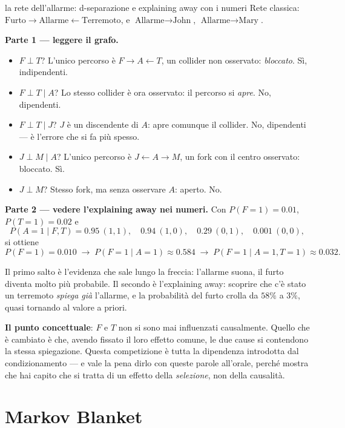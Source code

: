 \begin{esempiosvolto}{la rete dell'allarme: d-separazione e explaining away con i numeri}
Rete classica: $\text{Furto} \to \text{Allarme} \leftarrow \text{Terremoto}$, e $\text{Allarme} \to \text{John}$, $\text{Allarme} \to \text{Mary}$.

\medskip
\textbf{Parte 1 — leggere il grafo.}
\begin{itemize}[leftmargin=1.4em]
  \item $F \perp T$? L'unico percorso è $F \to A \leftarrow T$, un collider non osservato: \emph{bloccato}. Sì, indipendenti.
  \item $F \perp T \mid A$? Lo stesso collider è ora osservato: il percorso si \emph{apre}. No, dipendenti.
  \item $F \perp T \mid J$? $J$ è un discendente di $A$: apre comunque il collider. No, dipendenti — è l'errore che si fa più spesso.
  \item $J \perp M \mid A$? L'unico percorso è $J \leftarrow A \to M$, un fork con il centro osservato: bloccato. Sì.
  \item $J \perp M$? Stesso fork, ma senza osservare $A$: aperto. No.
\end{itemize}

\medskip
\textbf{Parte 2 — vedere l'explaining away nei numeri.} Con
$P(F{=}1) = 0.01$, $P(T{=}1) = 0.02$ e
\[
P(A{=}1 \mid F,T) = 0.95\ (1,1), \quad 0.94\ (1,0), \quad 0.29\ (0,1), \quad 0.001\ (0,0),
\]
si ottiene
\[
P(F{=}1) = 0.010 \;\longrightarrow\; P(F{=}1 \mid A{=}1) \approx 0.584 \;\longrightarrow\; P(F{=}1 \mid A{=}1, T{=}1) \approx 0.032.
\]

Il primo salto è l'evidenza che sale lungo la freccia: l'allarme suona, il furto diventa molto più probabile. Il secondo è l'explaining away: scoprire che c'è stato un terremoto \emph{spiega già} l'allarme, e la probabilità del furto crolla da $58\%$ a $3\%$, quasi tornando al valore a priori.

\textbf{Il punto concettuale}: $F$ e $T$ non si sono mai influenzati causalmente. Quello che è cambiato è che, avendo fissato il loro effetto comune, le due cause si contendono la stessa spiegazione. Questa competizione è tutta la dipendenza introdotta dal condizionamento — e vale la pena dirlo con queste parole all'orale, perché mostra che hai capito che si tratta di un effetto della \emph{selezione}, non della causalità.
\end{esempiosvolto}

\section{Markov Blanket}

